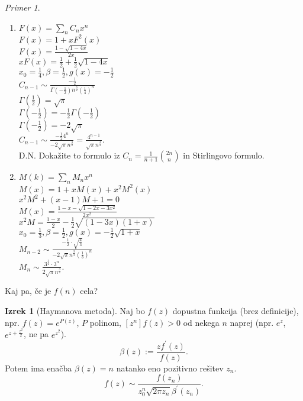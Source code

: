 \documentclass[a4paper, 12pt]{book}
\theoremstyle{definition}
\newtheorem{theorem}[counter]{Izrek}
\theoremstyle{remark}
\newtheorem*{ex}{Primer}
\begin{document}
\begin{ex} \text{}
  \begin{enumerate}[label=(\arabic*)]
    \item $F(x) = \sum_n C_n x^n$ \\
      $F(x) = 1 + x F^2(x)$ \\
      $F(x) = \frac{1 - \sqrt{1 - 4x}}{2x}$ \\
      $x F(x) = \frac{1}{2} + \frac{1}{2} \sqrt{1-4x}$ \\
      $x_0 = \frac{1}{4}, \beta = \frac{1}{2}, g(x) = -\frac{1}{2}$ \\
      $C_{n-1} \sim \frac{-\frac{1}{2}}{\Gamma\left(-\frac{1}{2}\right)
      n^{\frac{3}{2}} \left(\frac{1}{4}\right)^n}$ \\
      $\Gamma\left(\frac{1}{2}\right) = \sqrt{\pi}$ \\
      $\Gamma\left(-\frac{1}{2}\right) = -\frac{1}{2} \Gamma\left(-\frac{1}{2}\right)$ \\
      $\Gamma\left(-\frac{1}{2}\right) = - 2 \sqrt{\pi}$ \\
      $C_{n-1} \sim \frac{-\frac{1}{2} 4^n}{-2 \sqrt{\pi} n^{\frac{3}{2}}}
      = \frac{4^{n-1}}{\sqrt{\pi} n^{\frac{3}{2}}}$. \\
      D.N. Dokažite to formulo iz $C_n = \frac{1}{n+1} \binom{2n}{n}$ in Stirlingovo formulo.
    \item $M(k) = \sum_n M_n x^n$ \\
      $M(x) = 1 + x M(x) + x^2 M^2(x)$ \\
      $x^2 M^2 + (x-1) M + 1 = 0$ \\
      $M(x) = \frac{1 - x - \sqrt{1 - 2x - 3x^2}}{2x^2}$ \\
      $x^2 M = \frac{1-x}{2} - \frac{1}{2} \sqrt{(1-3x)(1+x)}$ \\
      $x_0 = \frac{1}{3}, \beta = \frac{1}{2}, g(x) = -\frac{1}{2} \sqrt{1 + x}$ \\
      $M_{n-2} \sim \frac{-\frac{1}{2} \cdot
      \sqrt{\frac{4}{3}}}{-2 \sqrt{\pi} n^{\frac{3}{2}} \left(\frac{1}{3}\right)^n}$ \\
      $M_n \sim \frac{3^{\frac{3}{2}} \cdot 3^n}{2 \sqrt{\pi} n^{\frac{3}{2}}}$.
  \end{enumerate}
\end{ex}
Kaj pa, če je $f(n)$ cela?
\begin{theorem}[Haymanova metoda]
  Naj bo $f(z)$ dopustna funkcija (brez definicije), npr. $f(z) = e^{P(z)}$, $P$ polinom,
  $[z^n] f(z) > 0$ od nekega $n$ naprej (npr. $e^z$, $e^{z + \frac{z^2}{2}}$, ne pa $e^{z^2}$). \\
  \begin{equation*}
    \beta(z) := \frac{z f^{'}(z)}{f(z)}.
  \end{equation*}
  Potem ima enačba $\beta(z) = n$ natanko eno pozitivno rešitev $z_n$. \\
  \begin{equation*}
    [z^n] f(z) \sim \frac{f(z_n)}{z_0^n \sqrt{2 \pi z_n} \beta^{'}(z_n)}.
  \end{equation*}
\end{theorem}
\end{document}
